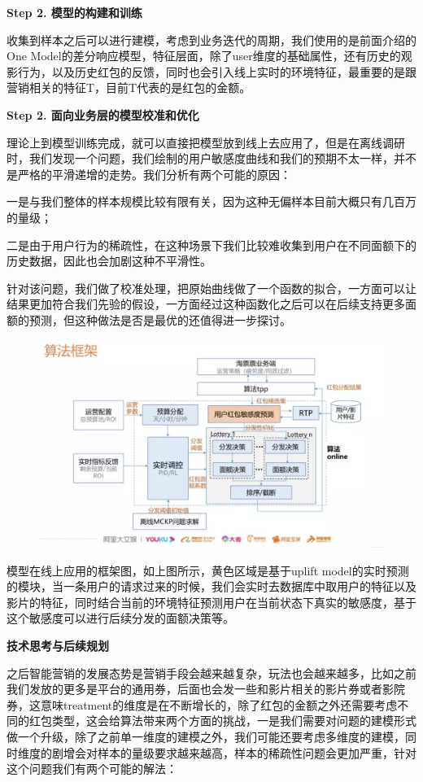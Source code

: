 \documentclass[12pt]{article}
\begin{document}
\textbf{ Step 2. 模型的构建和训练}

收集到样本之后可以进行建模，考虑到业务迭代的周期，我们使用的是前面介绍的One Model的差分响应模型，特征层面，除了user维度的基础属性，还有历史的观影行为，以及历史红包的反馈，同时也会引入线上实时的环境特征，最重要的是跟营销相关的特征T，目前T代表的是红包的金额。

\textbf{ Step 2. 面向业务层的模型校准和优化}

理论上到模型训练完成，就可以直接把模型放到线上去应用了，但是在离线调研时，我们发现一个问题，我们绘制的用户敏感度曲线和我们的预期不太一样，并不是严格的平滑递增的走势。我们分析有两个可能的原因：

一是与我们整体的样本规模比较有限有关，因为这种无偏样本目前大概只有几百万的量级；

二是由于用户行为的稀疏性，在这种场景下我们比较难收集到用户在不同面额下的历史数据，因此也会加剧这种不平滑性。

针对该问题，我们做了校准处理，把原始曲线做了一个函数的拟合，一方面可以让结果更加符合我们先验的假设，一方面经过这种函数化之后可以在后续支持更多面额的预测，但这种做法是否是最优的还值得进一步探讨。

\begin{figure}[H]
    \centering
    \includegraphics[width=1\textwidth]{fig/CasualInference-Uplift-Model-In-Ali4.png}
\end{figure}

模型在线上应用的框架图，如上图所示，黄色区域是基于uplift model的实时预测的模块，当一条用户的请求过来的时候，我们会实时去数据库中取用户的特征以及影片的特征，同时结合当前的环境特征预测用户在当前状态下真实的敏感度，基于这个敏感度可以进行后续分发的面额决策等。

\textbf{技术思考与后续规划}

之后智能营销的发展态势是营销手段会越来越复杂，玩法也会越来越多，比如之前我们发放的更多是平台的通用券，后面也会发一些和影片相关的影片券或者影院券，这意味treatment的维度是在不断增长的，除了红包的金额之外还需要考虑不同的红包类型，这会给算法带来两个方面的挑战，一是我们需要对问题的建模形式做一个升级，除了之前单一维度的建模之外，我们可能还要考虑多维度的建模，同时维度的剧增会对样本的量级要求越来越高，样本的稀疏性问题会更加严重，针对这个问题我们有两个可能的解法：
\end{document}
